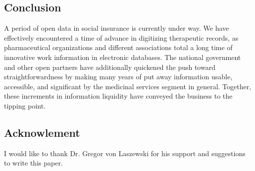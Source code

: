 \documentclass[sigconf]{acmart}
\begin{document}
\subsection{Conclusion}

A period of open data in social insurance is currently under way. We have effectively encountered a time of advance in digitizing therapeutic records, as pharmaceutical organizations and different associations total a long time of innovative work information in electronic databases. The national government and other open partners have additionally quickened the push toward straightforwardness by making many years of put away information usable, accessible, and significant by the medicinal services segment in general. Together, these increments in information liquidity have conveyed the business to the tipping point.

\subsection{Acknowlement}

  I would like to thank Dr. Gregor von Laszewski for his
  support and suggestions to write this paper.




    
    
    


    
    
    
    
\end{document}
